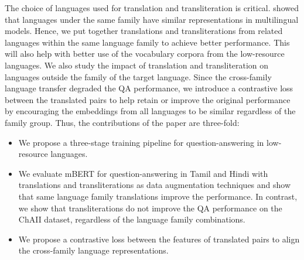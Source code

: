 \documentclass[11pt]{article}
\begin{document}
The choice of languages used for translation and transliteration is critical. \citet{kudugunta2019investigating} showed that languages under the same family have similar representations in multilingual models. Hence, we put together translations and transliterations from related languages within the same language family to achieve better performance. This will also help with better use of the vocabulary corpora from the low-resource languages. We also study the impact of translation and transliteration on languages outside the family of the target language. Since the cross-family language transfer degraded the QA performance, we introduce a contrastive loss {\citep{radford2021learning}} between the translated pairs to help retain or improve the original performance by encouraging the embeddings from all languages to be similar regardless of the family group. Thus, the contributions of the paper are three-fold:

\begin{itemize}
    \item We propose a three-stage training pipeline for question-answering in low-resource languages.
    \item We evaluate mBERT for question-answering in Tamil and Hindi with translations and transliterations as data augmentation techniques and show that same language family translations improve the performance. In contrast, we show that transliterations do not improve the QA performance on the ChAII dataset, regardless of the language family combinations.
    \item We propose a contrastive loss between the features of translated pairs to align the cross-family language representations.
\end{itemize}
\end{document}
